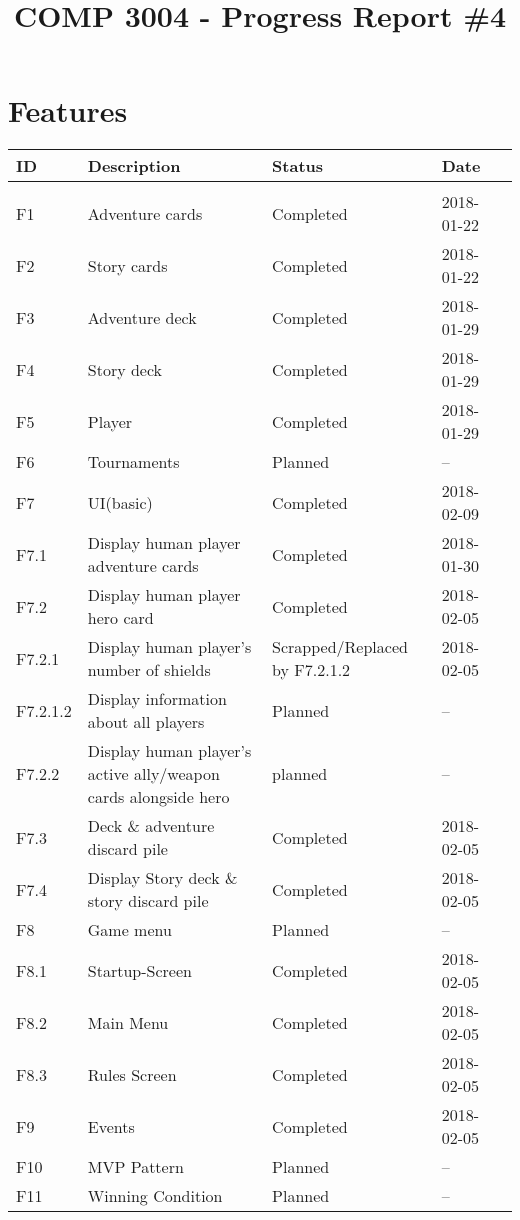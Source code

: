 \documentclass[10pt,a4paper]{article}
\title{COMP 3004 - Progress Report \#4}
\author{}
\date{}
\begin{document}
\maketitle
\section*{Features}

\begin{center}
\begin{tabularx}{\linewidth}{l X X l l}
ID & Description & Status & Date\\
\hline\\
F1 & Adventure cards & Completed & 2018-01-22\\
F2 & Story cards & Completed & 2018-01-22\\
F3 & Adventure deck & Completed & 2018-01-29\\
F4 & Story deck & Completed & 2018-01-29\\
F5 & Player & Completed & 2018-01-29\\
F6 & Tournaments & Planned & --\\
F7 & UI(basic) & Completed & 2018-02-09\\
F7.1 & Display human player adventure cards & Completed & 2018-01-30\\
F7.2 & Display human player hero card & Completed & 2018-02-05\\
F7.2.1 & Display human player's number of shields & Scrapped/Replaced by F7.2.1.2 & 2018-02-05\\
F7.2.1.2 & Display information about all players & Planned & --\\
F7.2.2 & Display human player's active ally/weapon cards alongside hero & planned & --\\
F7.3 & Deck \& adventure discard pile & Completed & 2018-02-05\\
F7.4 & Display Story deck \& story discard pile & Completed & 2018-02-05\\
F8 & Game menu & Planned & --\\
F8.1 & Startup-Screen & Completed & 2018-02-05\\
F8.2 & Main Menu & Completed & 2018-02-05\\
F8.3 & Rules Screen & Completed & 2018-02-05\\
F9 & Events & Completed & 2018-02-05\\
F10 & MVP Pattern & Planned & --\\
F11 & Winning Condition & Planned & --\\

\end{tabularx}
\end{center}
\end{document}
